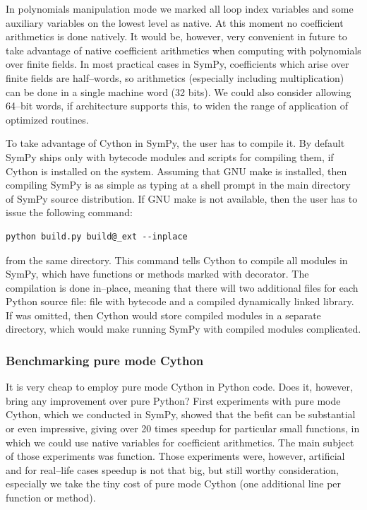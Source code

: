 In polynomials manipulation mode we marked all loop index variables and some auxiliary variables on
the lowest level as native. At this moment no coefficient arithmetics is done natively. It would be,
however, very convenient in future to take advantage of native coefficient arithmetics when computing
with polynomials over finite fields. In most practical cases in SymPy, coefficients which arise over
finite fields are half--words, so arithmetics (especially including multiplication) can be done in a
single machine word (32 bits). We could also consider allowing 64--bit words, if architecture supports
this, to widen the range of application of optimized routines.

To take advantage of Cython in SymPy, the user has to compile it. By default SymPy ships only with
bytecode modules and scripts for compiling them, if Cython is installed on the system. Assuming
that GNU make is installed, then compiling SymPy is as simple as typing  at a shell prompt
in the main directory of SymPy source distribution. If GNU make is not available, then the user
has to issue the following command:

\begin{Verbatim}[commandchars=@\[\]]
python build.py build@_ext --inplace
\end{Verbatim}
\noindent
from the same directory. This command tells Cython to compile all modules in SymPy, which have
functions or methods marked with  decorator. The compilation is done in--place,
meaning that there will two additional files for each Python source file:  file with
bytecode and a compiled dynamically linked library. If  was omitted, then Cython
would store compiled modules in a separate directory, which would make running SymPy with
compiled modules complicated.


\subsubsection{Benchmarking pure mode Cython}

It is very cheap to employ pure mode Cython in Python code. Does it, however, bring any improvement
over pure Python? First experiments with pure mode Cython, which we conducted in SymPy, showed that
the befit can be substantial or even impressive, giving over 20 times speedup for particular small
functions, in which we could use native variables for coefficient arithmetics. The main subject of
those experiments was  function. Those experiments were, however, artificial and
for real--life cases speedup is not that big, but still worthy consideration, especially we take
the tiny cost of pure mode Cython (one additional line per function or method).

